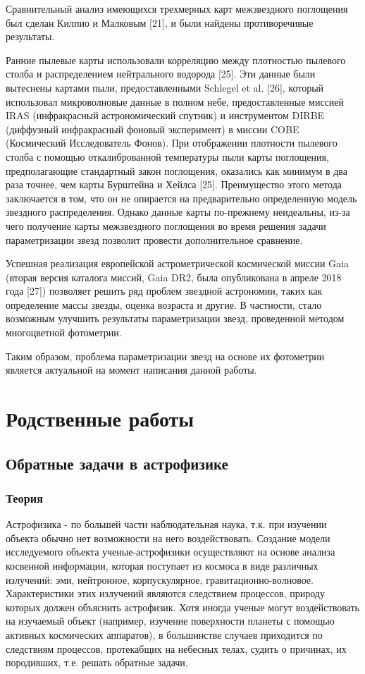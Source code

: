 \documentclass[12pt, a4paper]{article}
\begin{document}
	Сравнительный анализ имеющихся трехмерных карт межзвездного поглощения был сделан Килпио и Малковым [21], и были найдены противоречивые результаты.

	Ранние пылевые карты использовали корреляцию между плотностью пылевого столба и распределением нейтрального водорода [25]. Эти данные были вытеснены картами пыли, предоставленными Schlegel et al. [26], который использовал микроволновые данные в полном небе, предоставленные миссией IRAS (инфракрасный астрономический спутник) и инструментом DIRBE (диффузный инфракрасный фоновый эксперимент) в миссии COBE (Космический Исследователь Фонов). При отображении плотности пылевого столба с помощью откалиброванной температуры пыли карты поглощения, предполагающие стандартный закон поглощения, оказались как минимум в два раза точнее, чем карты Бурштейна и Хейлса [25]. Преимущество этого метода заключается в том, что он не опирается на предварительно определенную модель звездного распределения. Однако данные карты по-прежнему неидеальны, из-за чего получение карты межзвездного поглощения во время решения задачи параметризации звезд позволит провести дополнительное сравнение.

	Успешная реализация европейской астрометрической космической миссии Gaia (вторая версия каталога миссий, Gaia DR2, была опубликована в апреле 2018 года [27]) позволяет решить ряд проблем звездной астрономии, таких как определение массы звезды, оценка возраста и другие. В частности, стало возможным улучшить результаты параметризации звезд, проведенной методом многоцветной фотометрии.

	Таким образом, проблема параметризации звезд на основе их фотометрии является актуальной на момент написания данной работы.
	\section{Родственные работы}
	\subsection*{Обратные задачи в астрофизике}
	\subsubsection*{Теория}
	Астрофизика - по большей части наблюдательная наука, т.к. при изучении объекта обычно нет возможности на него воздействовать. Создание модели исследуемого объекта ученые-астрофизики осуществляют на основе анализа косвенной информации, которая поступает из космоса в виде различных излучений: эми, нейтронное, корпускулярное, гравитационно-волновое. Характеристики этих излучений являются следствием процессов, природу которых должен объяснить астрофизик. Хотя иногда ученые могут воздействовать на изучаемый объект (например, изучение поверхности планеты с помощью активных космических аппаратов), в большинстве случаев приходится по следствиям процессов, протекабщих на небесных телах, судить о причинах, их породивших, т.е. решать обратные задачи.
\end{document}
